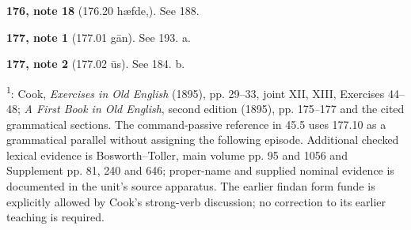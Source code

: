 \textbf{176, note 18} (176.20 hæfde,). See 188.

\textbf{177, note 1} (177.01 gān). See 193. a.

\textbf{177, note 2} (177.02 ūs). See 184. b.

\textsuperscript{1}: Cook, \emph{Exercises in Old English} (1895), pp. 29–33, joint XII, XIII, Exercises 44–48; \emph{A First Book in Old English}, second edition (1895), pp. 175–177 and the cited grammatical sections. The command-passive reference in 45.5 uses 177.10 as a grammatical parallel without assigning the following episode. Additional checked lexical evidence is Bosworth–Toller, main volume pp. 95 and 1056 and Supplement pp. 81, 240 and 646; proper-name and supplied nominal evidence is documented in the unit’s source apparatus. The earlier findan form funde is explicitly allowed by Cook’s strong-verb discussion; no correction to its earlier teaching is required.


\par\label{end-ch18-key}
\clearpage\endgroup
